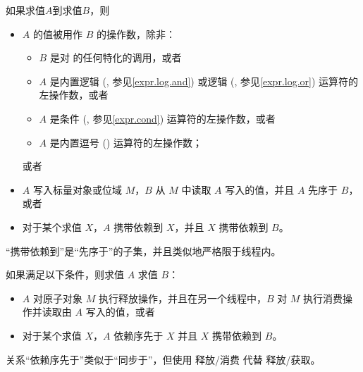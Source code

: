 \pnum
如果求值$A$到求值$B$，则
\begin{itemize}
    \item $A$ 的值被用作 $B$ 的操作数，除非：
    \begin{itemize}
        \item $B$ 是对  的任何特化的调用，或者
        \item $A$ 是内置逻辑  (\tcode{\&\&}, 参见\ref{expr.log.and}) 或逻辑  (\tcode{||}, 参见\ref{expr.log.or}) 运算符的左操作数，或者
        \item $A$ 是条件 (, 参见\ref{expr.cond}) 运算符的左操作数，或者
        \item $A$ 是内置逗号 (\tcode{,}) 运算符的左操作数；
    \end{itemize}
    或者
    \item $A$ 写入标量对象或位域 $M$，$B$ 从 $M$ 中读取 $A$ 写入的值，并且 $A$ 先序于 $B$，或者
    \item 对于某个求值 $X$，$A$ 携带依赖到 $X$，并且 $X$ 携带依赖到 $B$。
\end{itemize}
\begin{note}
“携带依赖到”是“先序于”的子集，并且类似地严格限于线程内。
\end{note}


\pnum
如果满足以下条件，则求值 $A$  求值 $B$：
\begin{itemize}
\item
$A$ 对原子对象 $M$ 执行释放操作，并且在另一个线程中，$B$ 对 $M$ 执行消费操作并读取由 $A$ 写入的值，或者

\item
对于某个求值 $X$，$A$ 依赖序先于 $X$ 并且 $X$ 携带依赖到 $B$。

\end{itemize}
\begin{note}
关系“依赖序先于”类似于“同步于”，但使用 释放/消费 代替 释放/获取。
\end{note}

